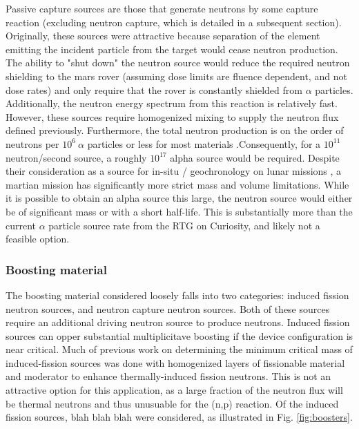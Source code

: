 \documentclass{mc2015}
\begin{document}
Passive capture sources \cite{weise_neutron_1984,jacobs_energy_1983,marsh_high_1995} are those that generate neutrons by some capture reaction (excluding neutron capture, which is detailed in a subsequent section). Originally, these sources were attractive because separation of the element emitting the incident particle from the target would cease neutron production. The ability to "shut down" the neutron source would reduce the required neutron shielding to the mars rover (assuming dose limits are fluence dependent, and not dose rates) and only require that the rover is constantly shielded from $\alpha$ particles.  Additionally, the neutron energy spectrum from this reaction is relatively fast. However, these sources require homogenized mixing to supply the neutron flux defined previously. Furthermore, the total neutron production is on the order of neutrons per $10^6\:\alpha$ particles or less for most materials \cite{weise_neutron_1984,jacobs_energy_1983}.Consequently, for a $10^{11}$ neutron/second source, a roughly $10^{17}$ alpha source would be required. Despite their consideration as a source for in-situ / geochronology on lunar missions \cite{li_evaluation_2011}, a martian mission has significantly more strict mass and volume limitations. While it is possible to obtain an alpha source this large, the neutron source would either be of significant mass or with a short half-life. This is substantially more than the current $\alpha$ particle source rate from the RTG on Curiosity, and likely not a feasible option. 

\subsubsection{Boosting material}

The boosting material considered loosely falls into two categories: induced fission neutron sources, and neutron capture neutron sources. Both of these sources require an additional driving neutron source to produce neutrons. Induced fission sources can opper substantial multiplicitave boosting if the device configuration is near critical.  Much of previous work on determining the minimum critical mass of induced-fission sources \cite{karni_semi-automated_keff,karni_smores_2003,goluoglu_smoresnew_2002} was done with homogenized layers of fissionable material and moderator to enhance thermally-induced fission neutrons. This is not an attractive option for this application, as a large fraction of the neutron flux will be thermal neutrons and thus unusuable for the (n,p) reaction. Of the induced fission sources, blah blah blah were considered, as illustrated in Fig. \ref{fig:boosters}.
\end{document}
